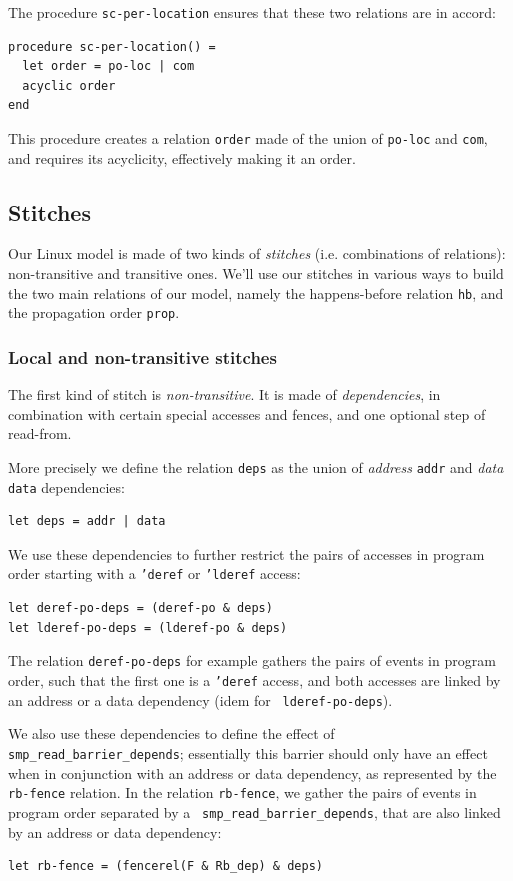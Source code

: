 \documentclass[a4paper]{article}
\begin{document}
The procedure {\tt sc-per-location} ensures that these two relations are in
accord:
\begin{verbatim}
procedure sc-per-location() =
  let order = po-loc | com
  acyclic order
end
\end{verbatim}

This procedure creates a relation {\tt order} made of the union of {\tt po-loc}
and {\tt com}, and requires its acyclicity, effectively making it an order.

\subsection{Stitches}

Our Linux model is made of two kinds of \emph{stitches} (i.e. combinations of
relations): non-transitive and transitive ones. We'll use our stitches in
various ways to build the two main relations of our model, namely the
happens-before relation {\tt hb}, and the propagation order {\tt prop}. 

\subsubsection{Local and non-transitive stitches\label{sec:local}}

The first kind of stitch is \emph{non-transitive}. It is made of
\emph{dependencies}, in combination with certain special accesses and fences,
and one optional step of read-from.

More precisely we define the relation {\tt deps} as the union of \emph{address}
{\tt addr} and \emph{data} {\tt data} dependencies: 
\begin{verbatim}
let deps = addr | data
\end{verbatim}

We use these dependencies to further restrict the pairs of accesses in program
order starting with a {\tt 'deref} or {\tt 'lderef} access: 
\begin{verbatim}
let deref-po-deps = (deref-po & deps)
let lderef-po-deps = (lderef-po & deps)
\end{verbatim}

The relation {\tt deref-po-deps} for example gathers the pairs of events in
program order, such that the first one is a {\tt 'deref} access, and both
accesses are linked by an address or a data dependency (idem for {\tt
lderef-po-deps}).

We also use these dependencies to define the effect of {\tt
smp\_read\_barrier\_depends}; essentially this barrier should only have an
effect when in conjunction with an address or data dependency, as represented
by the {\tt rb-fence} relation. In the relation {\tt rb-fence}, we gather the
pairs of events in program order separated by a {\tt
smp\_read\_barrier\_depends}, that are also linked by an address or data
dependency:
\begin{verbatim}
let rb-fence = (fencerel(F & Rb_dep) & deps)
\end{verbatim}
\end{document}
